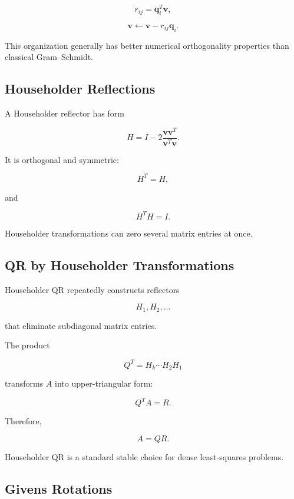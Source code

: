 \[
r_{ij}
=
\mathbf{q}_i^T\mathbf{v},
\]

\[
\boxed{
\mathbf{v}
\leftarrow
\mathbf{v}
-
r_{ij}\mathbf{q}_i.
}
\]

This organization generally has better numerical orthogonality properties
than classical Gram--Schmidt.

\subsection{Householder Reflections}
\label{subsec:householder-reflections}

A Householder reflector has form

\[
\boxed{
H
=
I
-
2
\frac{
\mathbf{v}\mathbf{v}^T
}{
\mathbf{v}^T\mathbf{v}
}.
}
\]

It is orthogonal and symmetric:

\[
\boxed{
H^T=H,
}
\]

and

\[
\boxed{
H^TH=I.
}
\]

Householder transformations can zero several matrix entries at once.

\subsection{QR by Householder Transformations}
\label{subsec:qr-householder}

Householder QR repeatedly constructs reflectors

\[
H_1,H_2,\ldots
\]

that eliminate subdiagonal matrix entries.

The product

\[
\boxed{
Q^T
=
H_k\cdots H_2H_1
}
\]

transforms \(A\) into upper-triangular form:

\[
\boxed{
Q^TA
=
R.
}
\]

Therefore,

\[
\boxed{
A=QR.
}
\]

Householder QR is a standard stable choice for dense least-squares
problems.

\subsection{Givens Rotations}
\label{subsec:givens-rotations}

